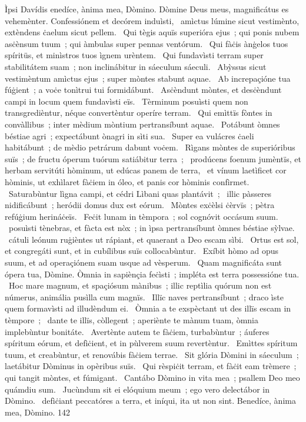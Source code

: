 { Ìpsi Davídis}
{%
enedíce, ànima mea, Dòmino. Dòmine Deus meus, magnificátus es vehemènter. Confessiónem et decórem induìsti, 
~amìctus lúmine sicut vestimènto, extèndens ċaelum sicut pellem. 
~Qui tègis aquïs superióra ejus~; qui ponis nubem asċènsum tuum~; qui àmbulas super pennas ventórum. 
~Qui fàċis ànġelos tuos spíritüs, et minìstros tuos ìgnem urèntem. 
~Qui fundavìsti terram super stabilitátem suam~; non inclinábitur in sáeculum sáeculi. 
~Abỳssus sicut vestimèntum amìctus ejus~; super mòntes stabunt aquae. 
~Ab increpaçióne tua fúġient~; a voċe tonìtrui tui formidábunt. 
~Asċèndunt mòntes, et desċèndunt campi in locum quem fundavìsti eïs. 
~Tèrminum posuìsti quem non transgredièntur, néque convertèntur operíre terram. 
~Qui emìttïs fòntes in convàllibus~; inter mèdium mòntium pertransíbunt aquae. 
~Potábunt òmnes béstiae agri~; expectábunt ònagri in sìti sua. 
~Super ea vulácres ċaeli habitábunt~; de mèdio petrárum dabunt voċem. 
~Rìgans mòntes de superióribus suïs~; de fructu óperum tuórum satiábitur terra~; 
~prodúcens foenum jumèntïs, et herbam servitúti hòminum, ut edúcas panem de terra, 
~et vínum laetìficet cor hòminis, ut exhìlaret fàċiem in óleo, et panis cor hòminis confìrmet. 
~Saturabùntur lìgna campi, et cédri Lìbani quas plantávit~;
~illic pàsseres nidificábunt~; heródii domus dux est eórum. 
~Mòntes exċèlsi ċèrvïs~; pètra refúġium herináċeïs. 
~Feċit lunam in tèmpora~; sol cognóvit occásum suum. 
~posuìsti tènebras, et fàcta est nòx~; in ìpsa pertransíbunt òmnes béstiae sỳlvae. 
~cátuli leónum ruġièntes ut rápiant, et quaerant a Deo escam sìbi. 
~Ortus est sol, et congregáti sunt, et in cubílibus suïs collocabùntur. 
~Exíbit hòmo ad opus suum, et ad operaçiónem suam usque ad vèsperum. 
~Quam magnificáta sunt ópera tua, Dòmine. Òmnia in sapiènçia feċìsti~; impléta est terra possessióne tua. 
~Hoc mare magnum, et spaçiósum mànibus~; illic reptìlia quórum non est númerus, animália pusìlla cum magnïs. 
~Illïc naves pertransíbunt~; draco ìste quem formavìsti ad illudèndum ei. 
~Òmnia a te exspèctant ut des illïs escam in tèmpore~; 
~dante te illïs, còllegent~; aperiènte te mànum tuam, òmnia implebùntur bonitáte. 
~Avertènte autem te fàċiem, turbabùntur~; áuferes spíritum eórum, et defìċient, et in pùlverem suum revertèntur. 
~Emìttes spíritum tuum, et creabùntur, et renovábis fàċiem terrae. 
~Sit glória Dòmini in sáeculum~; laetábitur Dòminus in opèribus suïs. 
~Qui rèspiċit terram, et fàċit eam trèmere~; qui tangit mòntes, et fúmigant. 
~Cantábo Dòmino in vita mea~; psallem Deo meo quámdiu sum. 
~Jucùndum sit ei elóquium meum~; ego vero delectábor in Dòmino. 
~defìċiant peccatóres a terra, et iníqui, ita ut non sint. Benedíce, ànima mea, Dòmino. 
}
{14}{2}

